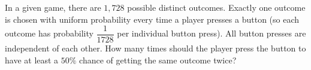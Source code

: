 In a given game, there are $1,728$ possible distinct outcomes. Exactly one outcome is chosen with uniform probability every time a player presses a button (so each outcome has probability $\dfrac{1}{1728}$ per individual button press). All button presses are independent of each other. How many times should the player press the button to have at least a $50 \%$ chance of getting the same outcome twice?
